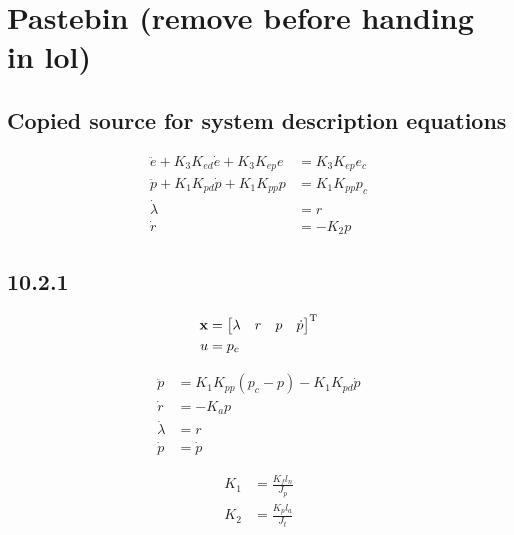 \section{Pastebin (remove before handing in lol)}



\subsection{Copied source for system description equations}
\begin{subequations}
\label{eq:model_al}
\begin{align}
	\ddot{e} + K_{3} K_{ed} \dot{e} + K_{3} K_{ep} e &= K_{3} K_{ep} e_{c} \label{eq:model_se_al_elev} \\
	\ddot{p} + K_{1} K_{pd} \dot{p} + K_{1} K_{pp} p &= K_{1} K_{pp} p_{c} \label{eq:model_se_al_pitch} \\
	\dot{\lambda} &= r \label{eq:model_se_al_lambda} \\
	\dot{r} &= -K_{2} p \label{eq:model_se_al_r} 
\end{align}
\end{subequations}



\subsection{10.2.1}

\begin{subequations}
\begin{align}
	\mathbf{x} 	&= \begin{bmatrix}\lambda & r & p & \dot{p} \end{bmatrix}^{\text{T}} \\
	u 		&= p_{c}
\end{align}
\end{subequations}

\begin{subequations}
\begin{align}
	\ddot{p} 		&= K_{1} K_{pp} (p_{c} - p) - K_{1} K_{pd} \dot{p} \\
	\dot{r} 		&= - K_{a} p \\
	\dot{\lambda} 	&= r \\
	\dot{p} 		&= \dot{p}
\end{align}
\end{subequations}

\begin{subequations}
\begin{align}
	K_{1} &= \frac{K_{f} l_{n}}{J_{p}} \\
	K_{2} &= \frac{K_{p} l_{a}}{J_{t}}
\end{align}
\end{subequations}

